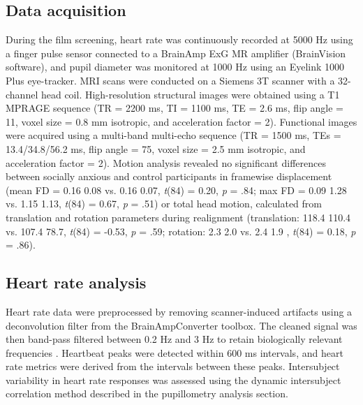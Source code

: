 \subsection*{Data acquisition}
During the film screening, heart rate was continuously recorded at 5000 Hz using a finger pulse sensor connected to a BrainAmp ExG MR amplifier (BrainVision software), and pupil diameter was monitored at 1000 Hz using an Eyelink 1000 Plus eye-tracker. MRI scans were conducted on a Siemens 3T scanner with a 32-channel head coil. High-resolution structural images were obtained using a T1 MPRAGE sequence (TR = 2200 ms, TI = 1100 ms, TE = 2.6 ms, flip angle = 11\textdegree, voxel size = 0.8 mm isotropic, and acceleration factor = 2). Functional images were acquired using a multi-band multi-echo sequence (TR = 1500 ms, TEs = 13.4/34.8/56.2 ms, flip angle = 75\textdegree, voxel size = 2.5 mm isotropic, and acceleration factor = 2). Motion analysis revealed no significant differences between socially anxious and control participants in framewise displacement (mean FD = 0.16 \textpm{} 0.08 vs. 0.16 \textpm{} 0.07, \textit{t}(84) = 0.20, \textit{p} = .84; max FD = 0.09 \textpm{} 1.28 vs. 1.15 \textpm{} 1.13, \textit{t}(84) = 0.67, \textit{p} = .51) or total head motion, calculated from translation and rotation parameters during realignment (translation: 118.4 \textpm{} 110.4 vs. 107.4 \textpm{} 78.7, \textit{t}(84) = -0.53, \textit{p} = .59; rotation: 2.3 \textpm{} 2.0 vs. 2.4 \textpm{} 1.9 , \textit{t}(84) = 0.18, \textit{p} = .86).

\subsection*{Heart rate analysis}
Heart rate data were preprocessed by removing scanner-induced artifacts using a deconvolution filter from the BrainAmpConverter toolbox. The cleaned signal was then band-pass filtered between 0.2 Hz and 3 Hz to retain biologically relevant frequencies \citep{avram2019}. Heartbeat peaks were detected within 600 ms intervals, and heart rate metrics were derived from the intervals between these peaks. Intersubject variability in heart rate responses was assessed using the dynamic intersubject correlation method described in the pupillometry analysis section.

